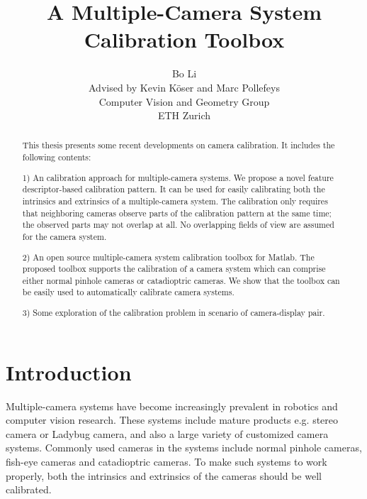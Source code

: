 \documentclass{report}
\title{\LARGE \bf
A Multiple-Camera System Calibration Toolbox
}
\author{
Bo Li \\ Advised by Kevin K\"oser and Marc Pollefeys\\
Computer Vision and Geometry Group\\ ETH Zurich
}
\begin{document}
\maketitle
\tableofcontents

\begin{abstract}
This thesis presents some recent developments on camera calibration. It includes the following contents: 

1) An calibration approach for multiple-camera systems. We propose a novel feature descriptor-based calibration pattern. It can be used for easily calibrating both the intrinsics and extrinsics of a multiple-camera system. The calibration only requires that neighboring cameras observe parts of the calibration pattern at the same time; the observed parts may not overlap at all. No overlapping fields of view are assumed for the camera system.

2) An open source multiple-camera system calibration toolbox for Matlab. The proposed toolbox supports the calibration of a camera system which can comprise either normal pinhole cameras or catadioptric cameras. We show that the toolbox can be easily used to automatically calibrate camera systems. 

3) Some exploration of the calibration problem in scenario of camera-display pair. 


\end{abstract}



\chapter{Introduction}
Multiple-camera systems have become increasingly prevalent in robotics and computer vision research. These systems include mature products e.g. stereo camera or Ladybug camera, and also a large variety of customized camera systems. Commonly used cameras in the systems include normal pinhole cameras, fish-eye cameras and catadioptric cameras. To make such systems to work properly, both the intrinsics and extrinsics of the cameras should be well calibrated. 
\end{document}
